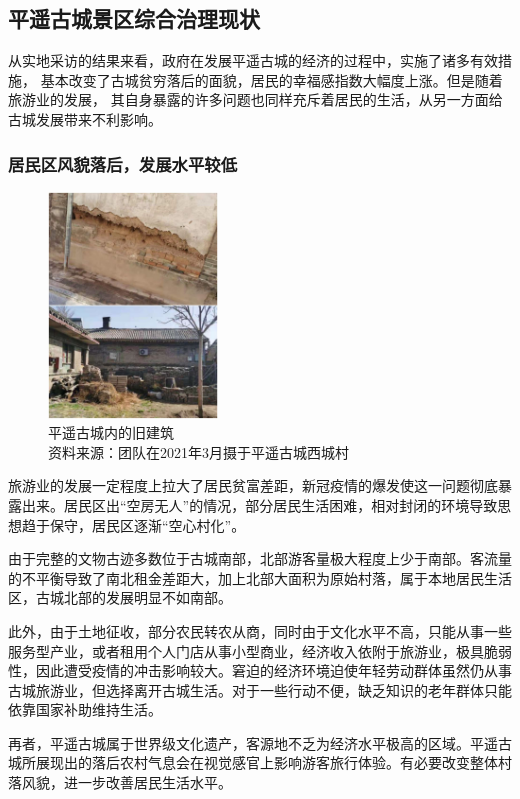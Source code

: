 \documentclass[UTF8]{ctexart}
\begin{document}
    \subsection{平遥古城景区综合治理现状}
    从实地采访的结果来看，政府在发展平遥古城的经济的过程中，实施了诸多有效措施， 基本改变了古城贫穷落后的面貌，居民的幸福感指数大幅度上涨。但是随着旅游业的发展， 其自身暴露的许多问题也同样充斥着居民的生活，从另一方面给古城发展带来不利影响。

        \subsubsection{居民区风貌落后，发展水平较低}
    \begin{figure}[H]
    \centering
    \includegraphics[width=4.5cm]{建筑.jpg}
    \caption[plain]{平遥古城内的旧建筑\\资料来源：团队在2021年3月摄于平遥古城西城村}
    \label{fig:my_label}
    \end{figure}
    旅游业的发展一定程度上拉大了居民贫富差距，新冠疫情的爆发使这一问题彻底暴露出来。居民区出“空房无人”的情况，部分居民生活困难，相对封闭的环境导致思想趋于保守，居民区逐渐“空心村化”。

    由于完整的文物古迹多数位于古城南部，北部游客量极大程度上少于南部。客流量的不平衡导致了南北租金差距大，加上北部大面积为原始村落，属于本地居民生活区，古城北部的发展明显不如南部。

    此外，由于土地征收，部分农民转农从商，同时由于文化水平不高，只能从事一些服务型产业，或者租用个人门店从事小型商业，经济收入依附于旅游业，极具脆弱性，因此遭受疫情的冲击影响较大。窘迫的经济环境迫使年轻劳动群体虽然仍从事古城旅游业，但选择离开古城生活。对于一些行动不便，缺乏知识的老年群体只能依靠国家补助维持生活。

    再者，平遥古城属于世界级文化遗产，客源地不乏为经济水平极高的区域。平遥古城所展现出的落后农村气息会在视觉感官上影响游客旅行体验。有必要改变整体村落风貌，进一步改善居民生活水平。
\end{document}
